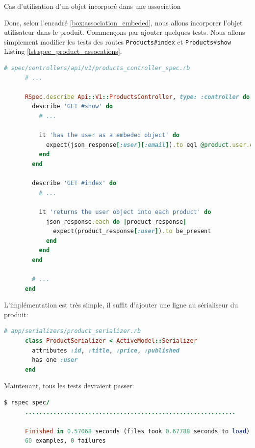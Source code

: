 \documentclass[]{report}
\begin{document}
\begin{tcolorbox}{Cas d'utilisation d'un objet incorporé dans une association}
    \end{tcolorbox}

    Donc, selon l'encadré \ref{box:association_embeded}, nous allons incorporer l'objet utilisateur dans le produit. Commençons par ajouter quelques tests. Nous allons simplement modifier les tests des routes \verb|Products#index| et \verb|Products#show| Listing \ref{lst:spec_product_assocations}.

    \begin{scriptsize}
      \begin{lstlisting}[language=ruby, caption={Test de l'associations des produits pour l'API}, label={lst:spec_product_assocations}]
      # spec/controllers/api/v1/products_controller_spec.rb
      # ...

      RSpec.describe Api::V1::ProductsController, type: :controller do
        describe 'GET #show' do
          # ...

          it 'has the user as a embeded object' do
            expect(json_response[:user][:email]).to eql @product.user.email
          end
        end

        describe 'GET #index' do
          # ...

          it 'returns the user object into each product' do
            json_response.each do |product_response|
              expect(product_response[:user]).to be_present
            end
          end
        end

        # ...
      end
      \end{lstlisting}
    \end{scriptsize}

    L'implémentation est très simple, il suffit d'ajouter une ligne au sérialiseur du produit:

    \begin{scriptsize}
      \begin{lstlisting}[language=ruby]
      # app/serializers/product_serializer.rb
      class ProductSerializer < ActiveModel::Serializer
        attributes :id, :title, :price, :published
        has_one :user
      end
      \end{lstlisting}
    \end{scriptsize}

    Maintenant, tous les tests devraient passer:

    \begin{scriptsize}
      \begin{lstlisting}[language=ruby]
      $ rspec spec/
      ............................................................

      Finished in 0.57068 seconds (files took 0.67788 seconds to load)
      60 examples, 0 failures
      \end{lstlisting}
    \end{scriptsize}
\end{document}
